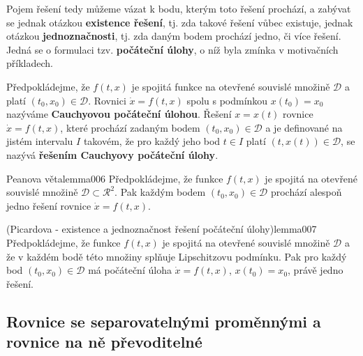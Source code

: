      Pojem řešení tedy můžeme vázat k bodu, kterým toto řešení prochází, a zabývat se jednak
      otázkou \textbf{existence řešení}, tj. zda takové řešení vůbec existuje, jednak otázkou
      \textbf{jednoznačnosti}, tj. zda daným bodem prochází jedno, či více řešení. Jedná se o
      formulaci tzv. \textbf{počáteční úlohy}, o níž byla zmínka v motivačních příkladech.

      \begin{mdframed}[style=mdnote] 
        Předpokládejme, že \(f(t, x)\) je spojitá funkce na otevřené souvislé množině
        \(\mathcal{D}\) a platí \((t_0, x_0) \in \mathcal{D}\). Rovnici \(\dot{x} = f(t, x)\) spolu
        s podmínkou \(x(t_0) = x_0\) nazýváme \textbf{Cauchyovou počáteční úlohou}. Řešení \(x =
        x(t)\) rovnice \(\dot{x} = f(t, x)\), které prochází zadaným bodem \((t_0, x_0) \in
        \mathcal{D}\) a je definované na jistém intervalu \(I\) takovém, že pro každý jeho bod
        \(t\in I\) platí \((t, x(t)) \in \mathcal{D}\), se nazývá \textbf{řešením Cauchyovy
        počáteční úlohy}.
      \end{mdframed}



      \begin{mathlemma}{Peanova věta}{lemma006}
        Předpokládejme, že funkce \(f(t, x)\) je spojitá na otevřené souvislé množině \(\mathcal{D}
        \subset \mathcal{R}^2\). Pak každým bodem \((t_0, x_0) \in \mathcal{D}\) prochází alespoň
        jedno řešení rovnice \(\dot{x} = f(t, x)\).
      \end{mathlemma} 




      \begin{mathlemma}{(Picardova - existence a jednoznačnost řešení počáteční úlohy)}{lemma007}
        Předpokládejme, že funkce \(f(t, x)\) je spojitá na otevřené souvislé množině
        \(\mathcal{D}\) a že v každém bodě této množiny splňuje Lipschitzovu podmínku. Pak pro každý
        bod \((t_0, x_0) \in \mathcal{D}\) má počáteční úloha \(\dot{x} = f(t, x)\), \(x(t_0) =
        x_0\), právě jedno řešení.
      \end{mathlemma} 


      
      \subsection{Rovnice se separovatelnými proměnnými a rovnice na ně
                  převoditelné}\label{mai:IIchapIVsecIIIssecI}
        
